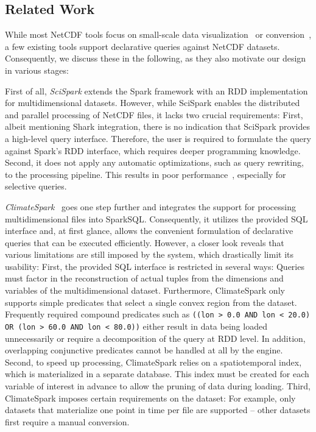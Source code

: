 \documentclass[conference]{IEEEtran}
\newcommand{\smalltt}[1]{{\texttt{\small #1}}}
\begin{document}
\subsection{Related Work}

While most NetCDF tools focus on small-scale data visualization~\cite{lit:panoply,lit:met3d,lit:cistools,lit:ncview} or conversion~\cite{lit:cdo}, a few existing tools support declarative queries against NetCDF datasets. Consequently, we discuss these in the following, as they also motivate our design in various stages: 

First of all, \emph{SciSpark}\cite{lit:scispark} extends the Spark framework with an RDD\cite{lit:rdd} implementation for multidimensional datasets. However, while SciSpark enables the distributed and parallel processing of NetCDF files, it lacks two crucial requirements: First, albeit mentioning Shark\cite{lit:shark} integration, there is no indication that SciSpark provides a high-level query interface. Therefore, the user is required to formulate the query against Spark's RDD interface, which requires deeper programming knowledge. Second, it does not apply any automatic optimizations, such as query rewriting, to the processing pipeline. This results in poor performance~\cite{lit:climatespark}, especially for selective queries. 

\textit{ClimateSpark}~\cite{lit:climatespark} goes one step further and integrates the support for processing multidimensional files into SparkSQL. Consequently, it utilizes the provided SQL interface and, at first glance, allows the convenient formulation of declarative queries that can be executed efficiently. However, a closer look reveals that various limitations are still imposed by the system, which drastically limit its usability: 
First, the provided SQL interface is restricted in several ways: Queries must factor in the reconstruction of actual tuples from the dimensions and variables of the multidimensional dataset. Furthermore, ClimateSpark only supports simple predicates that select a single convex region from the dataset. Frequently required compound predicates such as \smalltt{((lon > 0.0 AND lon < 20.0) OR (lon > 60.0 AND lon < 80.0))} either result in data being loaded unnecessarily or require a decomposition of the query at RDD level. In addition, overlapping conjunctive predicates cannot be handled at all by the engine.
Second, to speed up processing, ClimateSpark relies on a spatiotemporal index, which is materialized in a separate database. This index must be created for each variable of interest in advance to allow the pruning of data during loading. 
Third, ClimateSpark imposes certain requirements on the dataset: For example, only datasets that materialize one point in time per file are supported -- other datasets first require a manual conversion. 
\end{document}
